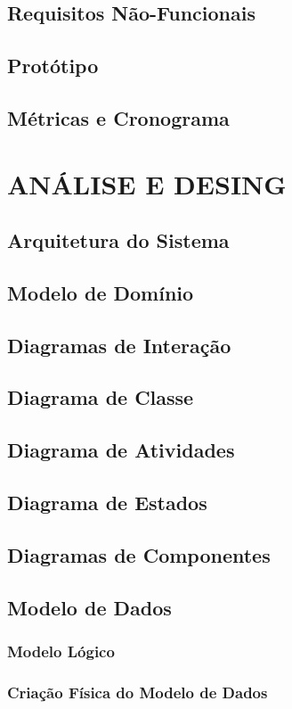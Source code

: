 \subsection{Requisitos Não-Funcionais}
\subsection{Protótipo}
\subsection{Métricas e Cronograma}

\section{ANÁLISE E DESING}

\subsection{Arquitetura do Sistema}
\subsection{Modelo de Domínio}
\subsection{Diagramas de Interação}
\subsection{Diagrama de Classe}
\subsection{Diagrama de Atividades}
\subsection{Diagrama de Estados}
\subsection{Diagramas de Componentes}
\subsection{Modelo de Dados}
\subsubsection{Modelo Lógico}
\subsubsection{Criação Física do Modelo de Dados}
